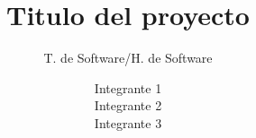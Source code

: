 \documentclass{beamer}
\title{Titulo del proyecto}
\subtitle{T. de Software/H. de Software}
\author{Integrante 1 \\ Integrante 2 \\ Integrante 3}
\begin{document}
\frame{\maketitle}
\end{document}
